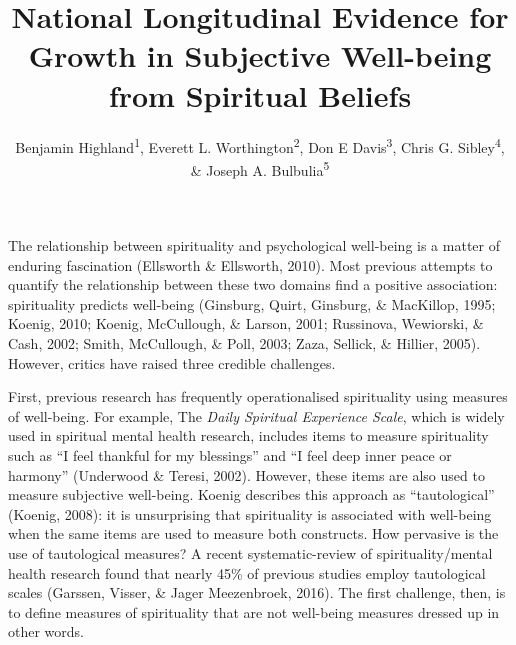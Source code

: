 \documentclass[
  english,
  man,floatsintext]{apa6}
\title{National Longitudinal Evidence for Growth in Subjective Well-being from Spiritual Beliefs}
\author{Benjamin Highland\textsuperscript{1}, Everett L. Worthington\textsuperscript{2}, Don E Davis\textsuperscript{3}, Chris G. Sibley\textsuperscript{4}, \& Joseph A. Bulbulia\textsuperscript{5}}
\date{}
\affiliation{\phantom{0}}
\begin{document}
\maketitle

The relationship between spirituality and psychological well-being is a matter of enduring fascination (Ellsworth \& Ellsworth, 2010). Most previous attempts to quantify the relationship between these two domains find a positive association: spirituality predicts well-being (Ginsburg, Quirt, Ginsburg, \& MacKillop, 1995; Koenig, 2010; Koenig, McCullough, \& Larson, 2001; Russinova, Wewiorski, \& Cash, 2002; Smith, McCullough, \& Poll, 2003; Zaza, Sellick, \& Hillier, 2005). However, critics have raised three credible challenges.

First, previous research has frequently operationalised spirituality using measures of well-being. For example, The \emph{Daily Spiritual Experience Scale}, which is widely used in spiritual mental health research, includes items to measure spirituality such as ``I feel thankful for my blessings'' and ``I feel deep inner peace or harmony'' (Underwood \& Teresi, 2002). However, these items are also used to measure subjective well-being. Koenig describes this approach as ``tautological'' (Koenig, 2008): it is unsurprising that spirituality is associated with well-being when the same items are used to measure both constructs. How pervasive is the use of tautological measures? A recent systematic-review of spirituality/mental health research found that nearly 45\% of previous studies employ tautological scales (Garssen, Visser, \& Jager Meezenbroek, 2016). The first challenge, then, is to define measures of spirituality that are not well-being measures dressed up in other words.
\end{document}
